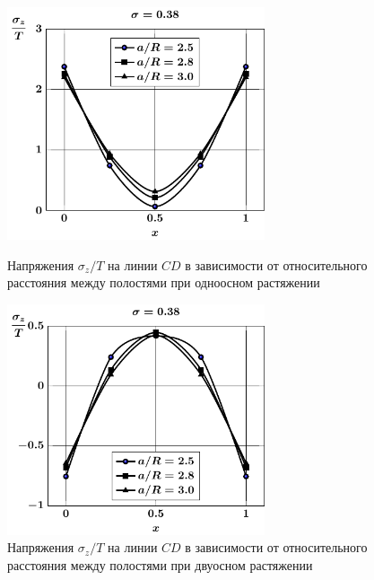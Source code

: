\begin{figure}[h!]
\centering\footnotesize
\parbox[b]{7.5cm}{\centering\includegraphics[width=7.6cm]{spheres-cav13-a-t1-sig_z-cd.pdf}
\caption{Напряжения $\sigma_z/T$ на линии $CD$ в зависимости от относительного расстояния между полостями при одноосном растяжении
\label{f:8:48}}}\hfil\hfil
\parbox[b]{7.5cm}{\centering\includegraphics[width=7.6cm]{spheres-cav13-a-t2-sig_z-cd.pdf}
\caption{Напряжения $\sigma_z/T$ на линии $CD$ в зависимости от относительного расстояния между полостями при двуосном растяжении
\label{f:8:49}}}
\end{figure}

